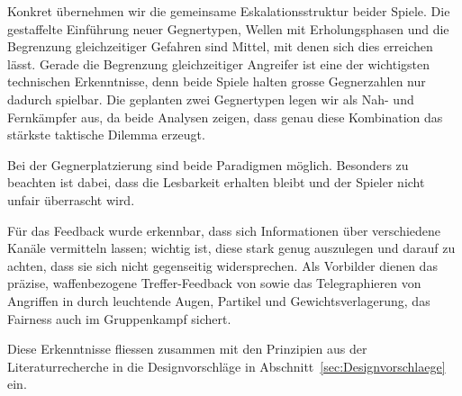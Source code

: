 \documentclass[../Main.tex]{subfiles}
\begin{document}
Konkret übernehmen wir die gemeinsame Eskalationsstruktur beider Spiele. Die gestaffelte Einführung neuer Gegnertypen, Wellen mit Erholungsphasen und die Begrenzung gleichzeitiger Gefahren sind Mittel, mit denen sich dies erreichen lässt. Gerade die Begrenzung gleichzeitiger Angreifer ist eine der wichtigsten technischen Erkenntnisse, denn beide Spiele halten grosse Gegnerzahlen nur dadurch spielbar. Die geplanten zwei Gegnertypen legen wir als Nah- und Fernkämpfer aus, da beide Analysen zeigen, dass genau diese Kombination das stärkste taktische Dilemma erzeugt.

Bei der Gegnerplatzierung sind beide Paradigmen möglich. Besonders zu beachten ist dabei, dass die Lesbarkeit erhalten bleibt und der Spieler nicht unfair überrascht wird.

Für das Feedback wurde erkennbar, dass sich Informationen über verschiedene Kanäle vermitteln lassen; wichtig ist, diese stark genug auszulegen und darauf zu achten, dass sie sich nicht gegenseitig widersprechen. Als Vorbilder dienen das präzise, waffenbezogene Treffer-Feedback von  sowie das Telegraphieren von Angriffen in  durch leuchtende Augen, Partikel und Gewichtsverlagerung, das Fairness auch im Gruppenkampf sichert.

Diese Erkenntnisse fliessen zusammen mit den Prinzipien aus der Literaturrecherche in die Designvorschläge in Abschnitt~\ref{sec:Designvorschlaege} ein.
\end{document}
